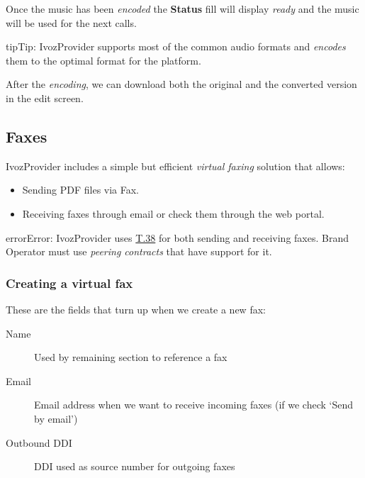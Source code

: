 \documentclass[letterpaper,10pt,english]{sphinxmanual}
\begin{document}
Once the music has been \emph{encoded} the \textbf{Status} fill will display \emph{ready} and
the music will be used for the next calls.

\begin{notice}{tip}{Tip:}
IvozProvider supports most of the common audio formats and \emph{encodes}
them to the optimal format for the platform.
\end{notice}

After the \emph{encoding}, we can download both the original and the converted
version in the edit screen.


\subsection{Faxes}
\label{administration_portal/client/vpbx/faxes:faxes}\label{administration_portal/client/vpbx/faxes::doc}\label{administration_portal/client/vpbx/faxes:faxing-system}
IvozProvider includes a simple but efficient \emph{virtual faxing} solution that allows:
\begin{itemize}
\item {} 
Sending PDF files via Fax.

\item {} 
Receiving faxes through email or check them through the web portal.

\end{itemize}

\begin{notice}{error}{Error:}
IvozProvider uses
\href{http://www.voip-info.org/wiki/view/T.38}{T.38} for both sending and receiving
faxes. Brand Operator must use \emph{peering contracts} that have support for it.
\end{notice}


\subsubsection{Creating a virtual fax}
\label{administration_portal/client/vpbx/faxes:creating-a-virtual-fax}
These are the fields that turn up when we create a new fax:
\begin{description}
\item[{Name}] \leavevmode{}\label{administration_portal/client/vpbx/faxes:term-name}
Used by remaining section to reference a fax

\item[{Email}] \leavevmode{}\label{administration_portal/client/vpbx/faxes:term-email}
Email address when we want to receive incoming faxes (if we check `Send
by email')

\item[{Outbound DDI}] \leavevmode{}\label{administration_portal/client/vpbx/faxes:term-outbound-ddi}
DDI used as source number for outgoing faxes

\end{description}
\end{document}
